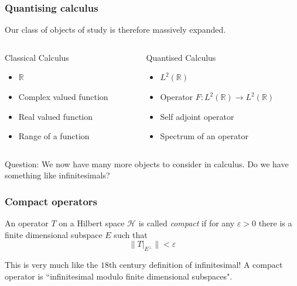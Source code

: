 \documentclass{beamer}
\newcommand{\Rl}{\mathbb{R}}
\begin{document}
\begin{frame}
\frametitle{Quantising calculus}
Our class of objects of study is therefore massively expanded.
        \begin{columns}[T]
            \begin{column}{.5\textwidth}
                \begin{block}{Classical Calculus}
                    \begin{itemize}
                        \item{} $\Rl$
                        \item{} Complex valued function
                        \item{} Real valued function                       
                        \item{} Range of a function
                    \end{itemize}
                \end{block}
            \end{column}
        
        
            \begin{column}{.5\textwidth}
                \begin{block}{Quantised Calculus}
                    \begin{itemize}
                        \item{} $L^2(\Rl)$
                        \item{} Operator $F:L^2(\Rl)\rightarrow L^2(\Rl)$
                        \item{} Self adjoint operator
                        \item{} Spectrum of an operator
                    \end{itemize}
                \end{block}
            \end{column}
        \end{columns}
        
\end{frame}

\begin{frame}
\begin{block}
{Question:}
    We now have many more objects to consider in calculus. 
    Do we have something like infinitesimals?
\end{block}
\end{frame}

\begin{frame}
\frametitle{Compact operators}
\begin{definition}
    An operator $T$ on a Hilbert space $\mathcal{H}$
    is called \emph{compact} if for any $\varepsilon > 0$
    there is a finite dimensional subspace $E$ such that 
    \begin{equation*}
        \| T|_{E^\perp}\| < \varepsilon
    \end{equation*}
\end{definition}
This is very much like the $18$th century definition of infinitesimal!
A compact operator is ``infinitesimal modulo finite dimensional subspaces".
\end{frame}
\end{document}
